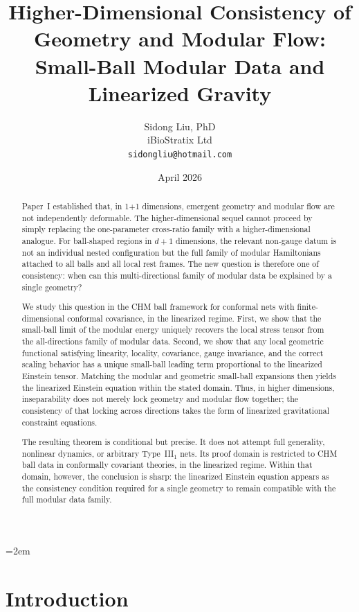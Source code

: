 \documentclass[12pt]{article}
\title{%
  \textbf{Higher-Dimensional Consistency of Geometry and Modular Flow:}\\
  \textbf{Small-Ball Modular Data and Linearized Gravity}%
}
\author{
  Sidong Liu, PhD \\
  \small iBioStratix Ltd \\
  \small \texttt{sidongliu@hotmail.com}
}
\date{April 2026}
\theoremstyle{definition}
\theoremstyle{remark}
\begin{document}
\emergencystretch=2em
\raggedbottom
{}

\maketitle

\begin{abstract}
%
Paper~I established that, in 1+1 dimensions, emergent geometry and
modular flow are not independently deformable. The higher-dimensional
sequel cannot proceed by simply replacing the one-parameter cross-ratio
family with a higher-dimensional analogue. For ball-shaped regions in
\(d+1\) dimensions, the relevant non-gauge datum is not an individual
nested configuration but the full family of modular Hamiltonians
attached to all balls and all local rest frames. The new question is
therefore one of consistency: when can this multi-directional family of
modular data be explained by a single geometry?

We study this question in the CHM ball framework for conformal nets with
finite-dimensional conformal covariance, in the linearized regime.
First, we show that the small-ball limit of the modular energy uniquely
recovers the local stress tensor from the all-directions family of
modular data. Second, we show that any local geometric functional
satisfying linearity, locality, covariance, gauge invariance, and the
correct scaling behavior has a unique small-ball leading term
proportional to the linearized Einstein tensor. Matching the modular and
geometric small-ball expansions then yields the linearized Einstein
equation within the stated domain. Thus, in higher dimensions,
inseparability does not merely lock geometry and modular flow together;
the consistency of that locking across directions takes the form of
linearized gravitational constraint equations.

The resulting theorem is conditional but precise. It does not attempt
full generality, nonlinear dynamics, or arbitrary Type~III$_1$ nets.
Its proof domain is restricted to CHM ball data in conformally covariant
theories, in the linearized regime. Within that domain, however, the
conclusion is sharp: the linearized Einstein equation appears as the
consistency condition required for a single geometry to remain
compatible with the full modular data family.
 \end{abstract}

\clearpage
\tableofcontents
\clearpage

%
\section{Introduction}\label{sec:1}
\end{document}

